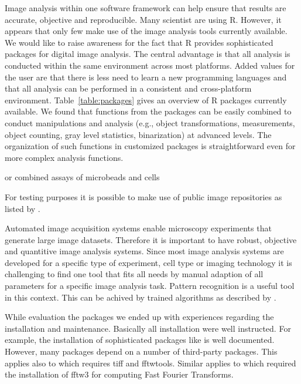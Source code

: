 Image analysis within one software framework can help ensure that results are 
accurate, objective and reproducible. Many scientist are using R. However, it 
appears that only few make use of the image analysis tools currently available. 
We would like to raise awareness for the fact that R provides sophisticated 
packages for digital image analysis. The central advantage is that all analysis 
is conducted within the same environment across most  platforms. Added values 
for the user are that there is less need to learn a new programming languages 
and that all analysis can be performed in a consistent and cross-platform 
environment. Table~\ref{table:packages} gives an overview of R packages 
currently available. We found that functions from the packages can be easily 
combined to conduct manipulations and analysis (e.g., object transformations, 
measurements, object counting, gray level statistics, binarization) at advanced 
levels. The organization of such functions in customized packages is 
straightforward even for more complex analysis functions.

\citep{rodiger_intestinal_2015} or combined assays of microbeads and cells 
\citep{grossmann_simultaneous_2016, scholz_second_2015}

For testing purposes it is possible to make use of public image repositories as 
listed by \citet{eliceiri_biological_2012}.

Automated image acquisition systems enable microscopy experiments that generate 
large image datasets. Therefore it is important to have robust, objective and 
quantitive image analysis systems. Since most image analysis systems are 
developed for a specific type of experiment, cell type or imaging technology it 
is challenging to find one tool that fits all needs by manual adaption of all 
parameters for a specific image analysis task. Pattern recognition is a useful 
tool in this context. This can be achived by trained algorithms as described by 
\citet{shamir_pattern_2010}. 

While evaluation the packages we ended up with experiences regarding the 
installation and maintenance. Basically all installation were well instructed. 
For example, the installation of sophisticated packages like  
is 
well documented. However, many packages depend on a number of third-party 
packages. This applies also to  which requires tiff and 
fftwtools. Similar applies to  which required the installation 
of fftw3 for computing Fast Fourier Transforms.

